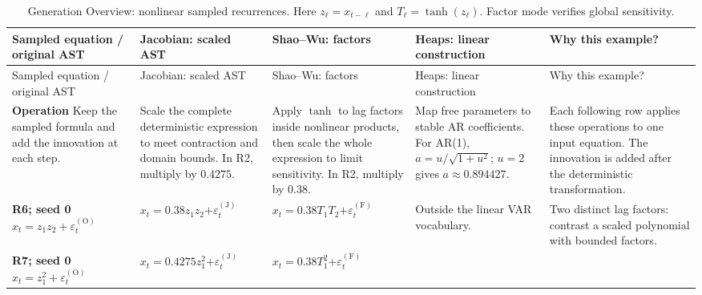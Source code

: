 \begin{landscape}
\begingroup
\renewcommand{\baselinestretch}{1}
\footnotesize
\setlength{\tabcolsep}{3pt}
\setlength{\LTcapwidth}{.97\linewidth}
\renewcommand{\arraystretch}{1.2}
\begin{longtable}{@{}
>{\raggedright\arraybackslash}p{.15\linewidth}
>{\raggedright\arraybackslash}p{.17\linewidth}
>{\raggedright\arraybackslash}p{.20\linewidth}
>{\raggedright\arraybackslash}p{.20\linewidth}
>{\raggedright\arraybackslash}p{.23\linewidth}@{}}
\caption{Generation Overview: nonlinear sampled recurrences.
Here $z_\ell=x_{t-\ell}$ and $T_\ell=\tanh(z_\ell)$.
Factor mode verifies global sensitivity.}\label{tab:generation-overview-nonlinear}\\
\toprule
Sampled equation / original AST & Jacobian: scaled AST & Shao--Wu: factors & Heaps: linear construction & Why this example?\\
\midrule
\endfirsthead
\toprule
Sampled equation / original AST & Jacobian: scaled AST & Shao--Wu: factors & Heaps: linear construction & Why this example?\\
\midrule
\endhead
\textbf{Operation}\newline
Keep the sampled formula and add the innovation at each step. &
Scale the complete deterministic expression to meet contraction and domain
bounds. In R2, multiply by $0.4275$. &
Apply $\tanh$ to lag factors inside nonlinear products, then scale the whole
expression to limit sensitivity. In R2, multiply by $0.38$. &
Map free parameters to stable AR coefficients. For AR(1),
$a=u/\sqrt{1+u^2}$; $u=2$ gives $a\approx0.894427$. &
Each following row applies these operations to one input equation.
The innovation is added after the deterministic transformation.\\
\midrule
\textbf{R6; seed 0}\newline
$x_t=z_1z_2+\varepsilon_t^{(\mathrm O)}$ &
$x_t=0.38z_1z_2$\newline $+\varepsilon_t^{(\mathrm J)}$ &
$x_t=0.38T_1T_2$\newline $+\varepsilon_t^{(\mathrm F)}$ &
Outside the linear VAR vocabulary. &
Two distinct lag factors: contrast a scaled polynomial with bounded factors.\\
\addlinespace
\textbf{R7; seed 0}\newline
$x_t=z_1^2+\varepsilon_t^{(\mathrm O)}$ &
$x_t=0.4275z_1^2$\newline $+\varepsilon_t^{(\mathrm J)}$ &
$x_t=0.38T_1^2$\newline $+\varepsilon_t^{(\mathrm F)}$ &

\end{longtable}
\end{landscape}
